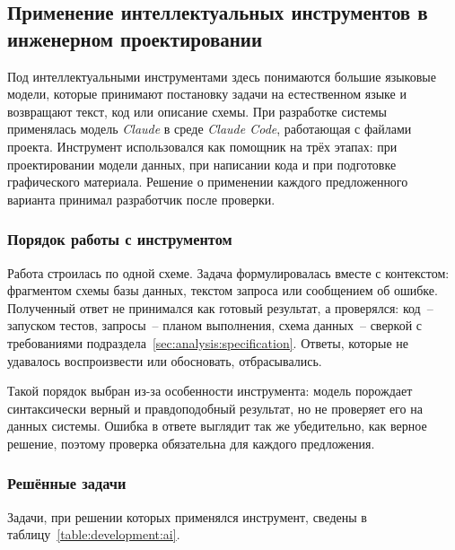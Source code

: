 \subsection{Применение интеллектуальных инструментов в инженерном проектировании}
\label{sec:development:ai}

Под интеллектуальными инструментами здесь понимаются большие языковые модели, которые принимают постановку задачи на естественном языке и возвращают текст, код или описание схемы. При разработке системы применялась модель \textit{Claude} в среде \textit{Claude Code}, работающая с файлами проекта. Инструмент использовался как помощник на трёх этапах: при проектировании модели данных, при написании кода и при подготовке графического материала. Решение о применении каждого предложенного варианта принимал разработчик после проверки.

\subsubsection{Порядок работы с инструментом}

Работа строилась по одной схеме. Задача формулировалась вместе с контекстом: фрагментом схемы базы данных, текстом запроса или сообщением об ошибке. Полученный ответ не принимался как готовый результат, а проверялся: код~-- запуском тестов, запросы~-- планом выполнения, схема данных~-- сверкой с требованиями подраздела~\ref{sec:analysis:specification}. Ответы, которые не удавалось воспроизвести или обосновать, отбрасывались.

Такой порядок выбран из-за особенности инструмента: модель порождает синтаксически верный и правдоподобный результат, но не проверяет его на данных системы. Ошибка в ответе выглядит так же убедительно, как верное решение, поэтому проверка обязательна для каждого предложения.

\subsubsection{Решённые задачи}

Задачи, при решении которых применялся инструмент, сведены в таблицу~\ref{table:development:ai}.

